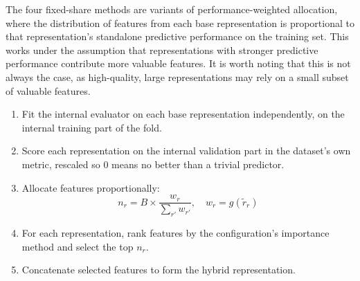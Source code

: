 


The four fixed-share methods are variants of performance-weighted allocation, where the distribution of features from each base representation is proportional to that representation's standalone predictive performance on the training set. This works under the assumption that representations with stronger predictive performance contribute more valuable features. It is worth noting that this is not always the case, as high-quality, large representations may rely on a small subset of valuable features.

\begin{enumerate}
    \item Fit the internal evaluator on each base representation independently, on the internal training part of the fold.
    \item Score each representation on the internal validation part in the dataset's own metric, rescaled so 0 means no better than a trivial predictor.
    \item Allocate features proportionally:
    \[
    n_r = B \times \frac{w_r}{\sum_{r'} w_{r'}}, \quad w_r = g(\tilde r_r)
    \]
    \item For each representation, rank features by the configuration's importance method and select the top $n_r$.
    \item Concatenate selected features to form the hybrid representation.
\end{enumerate}

